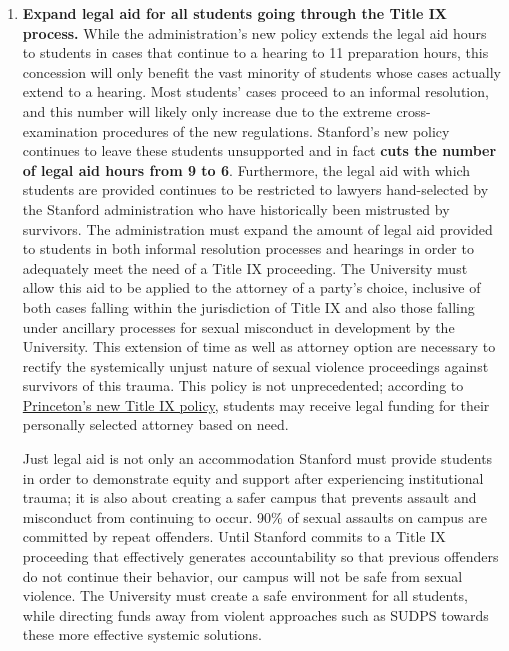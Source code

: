 \documentclass[12pt, titlepage, letterpaper]{article}
\begin{document}
\begin{enumerate}[label=\textbf{\arabic*.}]
    \item \textbf{Expand legal aid for all students going through the Title IX process.} While the administration’s new policy extends the legal aid hours to students in cases that continue to a hearing to 11 preparation hours, this concession will only benefit the vast minority of students whose cases actually extend to a hearing. Most students’ cases proceed to an informal resolution, and this number will likely only increase due to the extreme cross-examination procedures of the new regulations. Stanford’s new policy continues to leave these students unsupported and in fact \textbf{cuts the number of legal aid hours from 9 to 6}. Furthermore, the legal aid with which students are provided continues to be restricted to lawyers hand-selected by the Stanford administration who have historically been mistrusted by survivors. The administration must expand the amount of legal aid provided to students in both informal resolution processes and hearings in order to adequately meet the need of a Title IX proceeding. The University must allow this aid to be applied to the attorney of a party’s choice, inclusive of both cases falling within the jurisdiction of Title IX and also those falling under ancillary processes for sexual misconduct in development by the University. This extension of time as well as attorney option are necessary to rectify the systemically unjust nature of sexual violence proceedings against survivors of this trauma. This policy is not unprecedented; according to \href{https://sexualmisconduct.princeton.edu/policy}{Princeton’s new Title IX policy}, students may receive legal funding for their personally selected attorney based on need. 

    Just legal aid is not only an accommodation Stanford must provide students in order to demonstrate equity and support after experiencing institutional trauma; it is also about creating a safer campus that prevents assault and misconduct from continuing to occur. 90\% of sexual assaults on campus are committed by repeat offenders. Until Stanford commits to a Title IX proceeding that effectively generates accountability so that previous offenders do not continue their behavior, our campus will not be safe from sexual violence. The University must create a safe environment for all students, while directing funds away from violent approaches such as SUDPS towards these more effective systemic solutions.


\end{enumerate}
\end{document}
